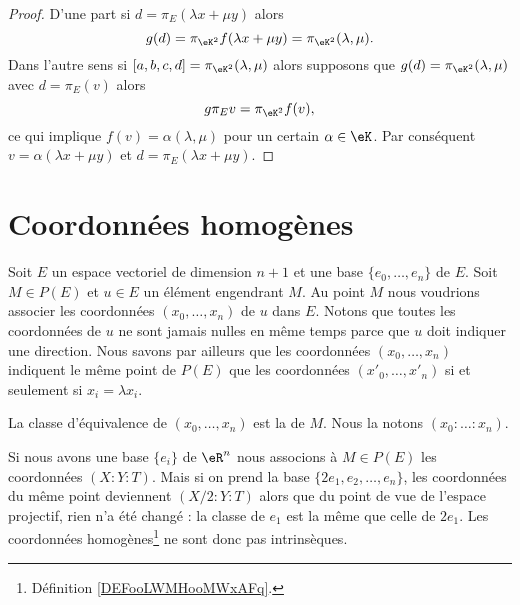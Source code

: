 \begin{proof}
    D'une part si \( d=\pi_E(\lambda x+\mu y)\) alors
    \begin{equation}
        g(d)=\pi_{\eK^2}f(\lambda x+\mu y)=\pi_{\eK^2}(\lambda,\mu).
    \end{equation}
    Dans l'autre sens si \( [a,b,c,d]=\pi_{\eK^2}(\lambda,\mu)\) alors supposons que \( g(d)=\pi_{\eK^2}(\lambda,\mu)\) avec \( d=\pi_E(v)\) alors
    \begin{equation}
        g\pi_Ev=\pi_{\eK^2}f(v),
    \end{equation}
    ce qui implique \( f(v)=\alpha(\lambda,\mu)\) pour un certain \( \alpha\in \eK\). Par conséquent \( v=\alpha(\lambda x+\mu y)\) et \( d=\pi_E(\lambda x+\mu y)\).
\end{proof}

\section{Coordonnées homogènes}

Soit \( E\) un espace vectoriel de dimension \( n+1\) et une base \( \{ e_0,\ldots, e_n \}\) de \( E\). Soit \( M\in P(E)\) et \( u\in E\) un élément engendrant \( M\). Au point \( M\) nous voudrions associer les coordonnées \( (x_0,\ldots, x_n)\) de \( u\) dans \( E\). Notons que toutes les coordonnées de \( u\) ne sont jamais nulles en même temps parce que \( u\) doit indiquer une direction. Nous savons par ailleurs que les coordonnées \( (x_0,\ldots, x_n)\) indiquent le même point de \( P(E)\) que les coordonnées \( (x'_0,\ldots, x'_n)\) si et seulement si \( x_i=\lambda x_i\).

\begin{definition}      \label{DEFooLWMHooMWxAFq}
    La classe d'équivalence de \( (x_0,\ldots, x_n)\) est la  de \( M\). Nous la notons \( (x_0:\ldots :x_n)\).
\end{definition}

Si nous avons une base \( \{ e_i \}\) de \( \eR^n\) nous associons à \( M\in P(E)\) les coordonnées \( (X:Y:T)\). Mais si on prend la base \( \{ 2e_1,e_2,\ldots, e_n \}\), les coordonnées du même point deviennent \( (X/2:Y:T)\) alors que du point de vue de l'espace projectif, rien n'a été changé : la classe de \( e_1\) est la même que celle de \( 2e_1\). Les coordonnées homogènes\footnote{Définition \ref{DEFooLWMHooMWxAFq}.} ne sont donc pas intrinsèques.

